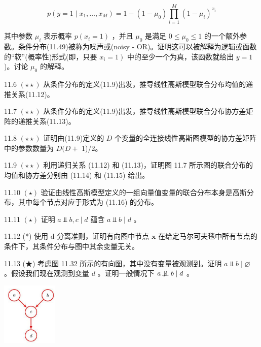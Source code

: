 \documentclass[10pt]{report}
\begin{document}
\[
p\left( {y = 1 \mid  {x}_{1},\ldots ,{x}_{M}}\right)  = 1 - \left( {1 - {\mu }_{0}}\right) \mathop{\prod }\limits_{{i = 1}}^{M}{\left( 1 - {\mu }_{i}\right) }^{{x}_{i}} \tag{11.49}
\]

其中参数 \({\mu }_{i}\) 表示概率 \(p\left( {{x}_{i} = 1}\right)\) ，并且 \({\mu }_{0}\) 是满足 \(0 \leq  {\mu }_{0} \leq  1\) 的一个额外参数。条件分布(11.49)被称为噪声或(noisy - OR)。证明这可以被解释为逻辑或函数的“软”(概率性)形式(即，只要 \(\left. {{x}_{i} = 1}\right)\) 中的至少一个为真，该函数就给出 \(y = 1\) )。讨论 \({\mu }_{0}\) 的解释。

11.6 \(\left( {\star  \star  }\right)\) 从条件分布的定义(11.9)出发，推导线性高斯模型联合分布均值的递推关系(11.12)。

11.7 \(\left( {\star  \star  }\right)\) 从条件分布的定义(11.9)出发，推导线性高斯模型联合分布协方差矩阵的递推关系(11.13)。

11.8 \(\left( {\star  \star  }\right)\) 证明由(11.9)定义的 \(D\) 个变量的全连接线性高斯图模型的协方差矩阵中的参数数量为 \(D(D +\) 1)/2。

11.9 \(\left( {\star  \star  }\right)\) 利用递归关系 (11.12) 和 (11.13)，证明图 11.7 所示图的联合分布的均值和协方差分别由 (11.14) 和 (11.15) 给出。

11.10 \(\left( \star \right)\) 验证由线性高斯模型定义的一组向量值变量的联合分布本身是高斯分布，其中每个节点对应于形式为 (11.16) 的分布。

11.11 \(\left( \star \right)\) 证明 \(a ⫫ b,c \mid  d\) 蕴含 \(a ⫫ b \mid  d\) 。

11.12 (*) 使用 d-分离准则，证明有向图中节点 \(\mathbf{x}\) 在给定马尔可夫毯中所有节点的条件下，其条件分布与图中其余变量无关。

11.13 (★) 考虑图 11.32 所示的有向图，其中没有变量被观测到。证明 \(a ⫫ b \mid  \varnothing\) 。假设我们现在观测到变量 \(d\) 。证明一般情况下 \(a \mathrel{ \not \! \perp \!\!\! \perp } b \mid  d\) 。

\begin{center}
\includegraphics[max width=0.2\textwidth]{images/0194e279-9b28-703a-88f4-c3ac21e2010d_374_1272_337_281_316_0.jpg}
\end{center}
\hspace*{3em} 
\end{document}
